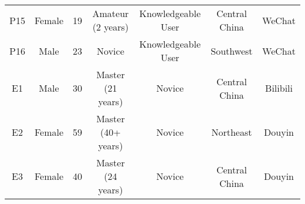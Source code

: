 \begin{table}[H]
{\begin{tabular}{ccccccc}
P15 & Female & 19  & Amateur (2 years)       & Knowledgeable User & Central China & WeChat   \\
P16 & Male   & 23  & Novice                  & Knowledgeable User & Southwest     & WeChat   \\ \hline
E1  & Male   & 30  & Master (21 years)       & Novice             & Central China & Bilibili \\
E2  & Female & 59  & Master (40+ years)      & Novice             & Northeast     & Douyin   \\
E3  & Female & 40  & Master (24 years)       & Novice             & Central China & Douyin   \\ \hline
\end{tabular}
}
\end{table}
